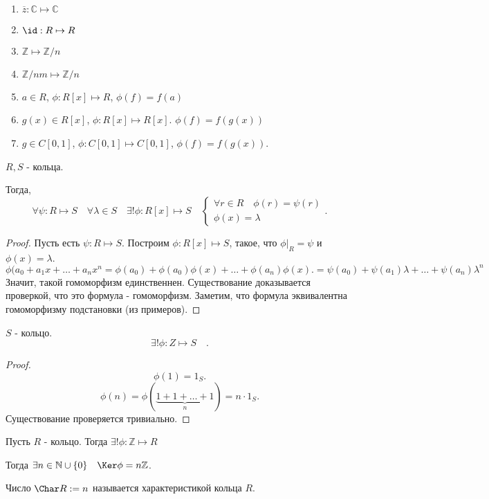 \begin{example} \thmslashn

    \begin{enumerate}
        \item $\overline{z} : \mathbb{C} \mapsto \mathbb{C}$ 
        \item $\id : R \mapsto R$
        \item $\mathbb{Z} \mapsto \mathbb{Z}/n$ 
        \item $\mathbb{Z}/nm \mapsto \mathbb{Z}/n$
        \item $a\in R$, $\phi : R[x] \mapsto R$, $\phi(f) = f(a)$ 
        \item $g(x)\in R[x]$, $\phi : R[x] \mapsto R[x]$. $\phi(f) = f(g(x))$
        \item $g\in C[0, 1]$, $\phi : C[0, 1] \mapsto C[0, 1]$, $\phi(f) = f(g(x))$.
    \end{enumerate}
\end{example}

\begin{statement} \thmslashn

    $R, S$ - кольца.

    Тогда,
    \[ \forall{\psi : R \mapsto S}\quad \forall{\lambda\in S}\quad \exists!{\phi : R[x] \mapsto S}\quad \begin{cases}
        \forall{r\in R}\quad \phi(r) = \psi(r)\\
        \phi(x) = \lambda
    \end{cases}   .\] 

    \begin{proof}
        Пусть есть $\psi : R \mapsto S$. Построим $\phi : R[x] \mapsto S$, такое, что $\left. \phi\right|_{R} = \psi$ и $\phi(x) = \lambda$.
            \[ \phi(a_0 + a_1x + \ldots + a_{n}x^{n} = \phi(a_0) + \phi(a_0)\phi(x) + \ldots + \phi(a_n)\phi(x) .= \psi(a_0) + \psi(a_1)\lambda + \ldots + \psi(a_n)\lambda^{n}\]
            Значит, такой гомоморфизм единственнен. Существование доказывается проверкой, что это формула - гомоморфизм. Заметим, что формула эквивалентна гомоморфизму подстановки (из примеров).
    \end{proof}
\end{statement}
\begin{statement} \thmslashn

    $S$ - кольцо.
    \[ \exists!{\phi : Z \mapsto S}\quad  .\]
    \begin{proof}
        \[ \phi(1) = 1_{S} .\]
        \[ \phi(n) = \phi(\underbrace{1+1+\ldots+1}_{n}) = n\cdot 1_{S} .\]
        Существование проверяется тривиально.
    \end{proof}
\end{statement}
\begin{definition} \thmslashn 

    Пусть $R$ - кольцо. Тогда $\exists!{\phi : \mathbb{Z} \mapsto R}\quad $
    
    Тогда $\exists{n\in \mathbb{N} \cup \{0\} }\quad \Ker \phi = n \mathbb{Z}$.

    Число $\Char R := n$ называется характеристикой кольца $R$.
\end{definition}

